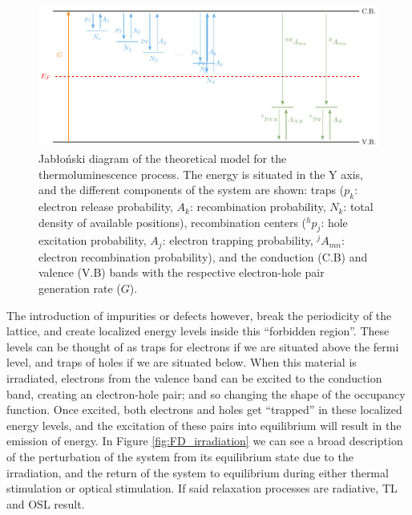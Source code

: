 \begin{figure}[H]
  \centering
  \includegraphics[width=\textwidth]{Images/modeldiagram.pdf}
  \caption[Jab\l oński diagram illustrating the theoretical TL model with traps and transitions.]{Jab\l oński diagram of the theoretical model for the thermoluminescence process. The energy is situated in the Y axis, and the different components of the system are shown: traps ($p_k$: electron release probability, $A_k$: recombination probability, $N_k$: total density of available positions), recombination centers ($^hp_j$: hole excitation probability, $A_j$: electron trapping probability, $^jA_{mn}$: electron recombination probability), and the conduction (C.B) and valence (V.B) bands with the respective electron-hole pair generation rate ($G$).}
  \label{fig:TheoreticalModel}
\end{figure}

\vspace{10pt}
The introduction of impurities or defects however, break the periodicity of the lattice, and create localized energy levels inside this ``forbidden region''. These levels can be thought of as traps for electrons if we are situated above the fermi level, and traps of holes if we are situated below. When this material is irradiated, electrons from the valence band can be excited to the conduction band, creating an electron-hole pair; and so changing the shape of the occupancy function. Once excited, both electrons and holes get ``trapped'' in these localized energy levels, and the excitation of these pairs into equilibrium will result in the emission of energy. In Figure \ref{fig:FD_irradiation} we can see a broad description of the perturbation of the system from its equilibrium state due to the irradiation, and the return of the system to equilibrium during either thermal stimulation or optical stimulation. If said relaxation processes are radiative, TL and OSL result. 

\vspace{10pt}

